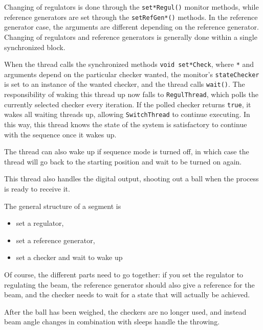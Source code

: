 Changing of regulators is done through the \texttt{set*Regul()} monitor methods, while reference generators are set through the \texttt{setRefGen*()} methods. 
In the reference generator case, the arguments are different depending on the reference generator. 
Changing of regulators and reference generators is generally done within a single synchronized block.

When the thread calls the synchronized methods \texttt{void set*Check}, where \texttt{*} and arguments depend on the particular checker wanted, the monitor's \texttt{stateChecker} is set to an instance of the wanted checker, and the thread calls \texttt{wait()}. 
The responsibility of waking this thread up now falls to \texttt{RegulThread}, which polls the currently selected checker every iteration. 
If the polled checker returns \texttt{true}, it wakes all waiting threads up, allowing \texttt{SwitchThread} to continue executing. 
In this way, this thread knows the state of the system is satisfactory to continue with the sequence once it wakes up.

The thread can also wake up if sequence mode is turned off, in which case the thread will go back to the starting position and wait to be turned on again.

This thread also handles the digital output, shooting out a ball when the process is ready to receive it.

The general structure of a segment is
\begin{itemize}
\item set a regulator,
\item set a reference generator,
\item set a checker and wait to wake up
\end{itemize}

Of course, the different parts need to go together: if you set the regulator to regulating the beam, 
the reference generator should also give a reference for the beam, 
and the checker needs to wait for a state that will actually be achieved.

After the ball has been weighed, the checkers are no longer used, and instead beam angle changes in combination with sleeps handle the throwing.
